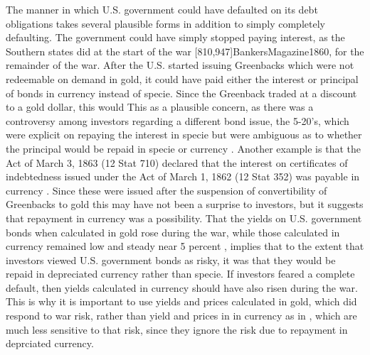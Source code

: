 The manner in which U.S. government could have defaulted on its debt obligations takes several plausible forms in addition to simply completely defaulting.
The government could have simply stopped paying interest, as the Southern states did at the start of the war \parencite[159]{BankersMagazine1862}[810,947]{BankersMagazine1860}, for the remainder of the war.
After the U.S. started issuing Greenbacks which were not redeemable on demand in gold, it could have paid either the interest or principal of bonds in currency instead of specie.
Since the Greenback traded at a discount to a gold dollar, this would 
This as a plausible concern, as there was a controversy among investors regarding a different bond issue, the 5-20's, which were explicit on repaying the interest in specie but were ambiguous as to whether the principal would be repaid in specie or currency \parencite{Roll1972}.
Another example is that the Act of March 3, 1863 (12 Stat 710) declared that the interest on certificates of indebtedness issued under the Act of March 1, 1862 (12 Stat 352) was payable in currency \parencite[81]{Bayley1882}.
Since these were issued after the suspension of convertibility of Greenbacks to gold this may have not been a surprise to investors, but it suggests that repayment in currency was a possibility. 
That the yields on U.S. government bonds when calculated in gold rose during the war, while those calculated in currency remained low and steady near 5 percent \parencite[305]{HomerSylla2005}, implies that to the extent that investors viewed U.S. government bonds as risky, it was that they would be repaid in depreciated currency rather than specie.%
If investors feared a complete default, then yields calculated in currency should have also risen during the war.
This is why it is important to use yields and prices calculated in gold, which did respond to war risk, rather than yield and prices in in currency as in \textcite{HomerSylla2005}, which are much less sensitive to that risk, since they ignore the risk due to repayment in deprciated currency.

